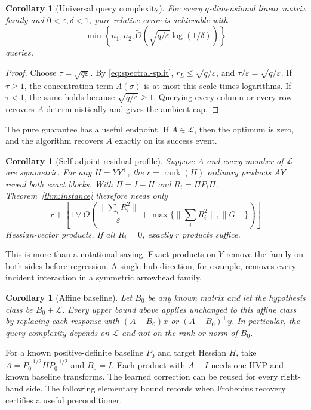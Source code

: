 \documentclass{article}
\newtheorem{corollary}[theorem]{Corollary}
\theoremstyle{remark}
\newcommand{\cL}{\mathcal L}
\newcommand{\eps}{\varepsilon}
\newcommand{\rank}{\operatorname{rank}}
\newcommand{\wtO}{\widetilde O}
\newcommand{\1}{\mathbf 1}
\begin{document}
\begin{corollary}[Universal query complexity]
\label{cor:universal}
For every $q$-dimensional linear matrix family and $0<\eps,\delta<1$, pure relative error is achievable with
\begin{equation}
 \min\left\{n_1,n_2,
 \wtO\!\left(\sqrt{q/\eps}\log(1/\delta)\right)\right\}
 \label{eq:universal-q}
\end{equation}
queries.
\end{corollary}

\begin{proof}
Choose $\tau=\sqrt{q\eps}$.  By \eqref{eq:spectral-split}, $r_L\le\sqrt{q/\eps}$, and $\tau/\eps=\sqrt{q/\eps}$.  If $\tau\ge1$, the concentration term $\Lambda(\sigma)$ is at most this scale times logarithms.  If $\tau<1$, the same holds because $\sqrt{q/\eps}\ge1$.  Querying every column or every row recovers $A$ deterministically and gives the ambient cap.
\end{proof}

The pure guarantee has a useful endpoint.  If $A\in\cL$, then the optimum is zero, and the algorithm recovers $A$ exactly on its success event.

\begin{corollary}[Self-adjoint residual profile]
\label{cor:self-adjoint}
Suppose $A$ and every member of $\cL$ are symmetric.  For any $H=YY^\top$, the $r=\rank(H)$ ordinary products $AY$ reveal both exact blocks. With $\Pi=I-H$ and $R_i=\Pi P_i\Pi$, Theorem~\ref{thm:instance} therefore needs only \[ r+\left[1\vee\wtO\!\left(\frac{\|\sum_iR_i^2\|}{\eps} +\max\{\|\sum_iR_i^2\|,\|G\|\}\right)\right] \] Hessian-vector products.  If all $R_i=0$, exactly $r$ products suffice.
\end{corollary}

This is more than a notational saving.  Exact products on $Y$ remove the family on both sides before regression.  A single hub direction, for example, removes every incident interaction in a symmetric arrowhead family.

\begin{corollary}[Affine baseline]
\label{cor:affine}
Let $B_0$ be any known matrix and let the hypothesis class be $B_0+\cL$.  Every upper bound above applies unchanged to this affine class by replacing each response with $(A-B_0)x$ or $(A-B_0)^\top y$.  In particular, the query complexity depends on $\cL$ and not on the rank or norm of $B_0$.
\end{corollary}

For a known positive-definite baseline $P_0$ and target Hessian $H$, take $A=P_0^{-1/2}HP_0^{-1/2}$ and $B_0=I$.  Each product with $A-I$ needs one HVP and known baseline transforms.  The learned correction can be reused for every right-hand side.  The following elementary bound records when Frobenius recovery certifies a useful preconditioner.
\end{document}
